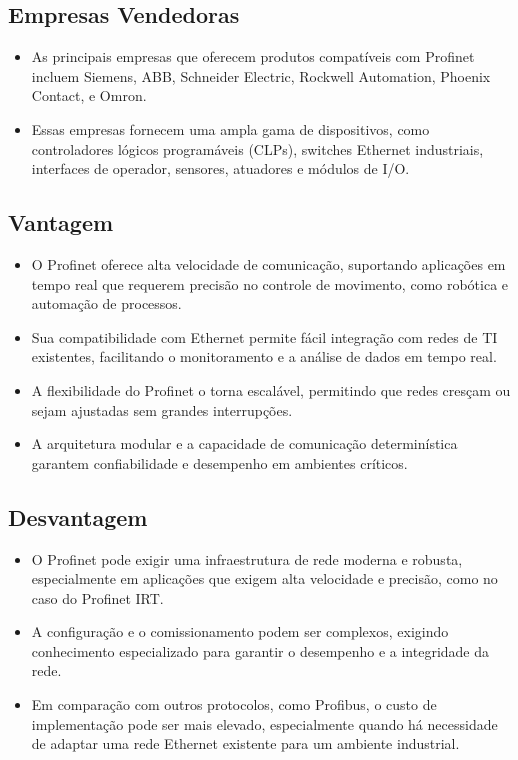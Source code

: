\documentclass[a4paper,11pt]{article} %
\begin{document}
\subsection{Empresas Vendedoras}
\begin{itemize}
    \item As principais empresas que oferecem produtos compatíveis com Profinet incluem Siemens, ABB, Schneider Electric, Rockwell Automation, Phoenix Contact, e Omron.
    \item Essas empresas fornecem uma ampla gama de dispositivos, como controladores lógicos programáveis (CLPs), switches Ethernet industriais, interfaces de operador, sensores, atuadores e módulos de I/O.
\end{itemize}

\subsection{Vantagem}
\begin{itemize}
    \item O Profinet oferece alta velocidade de comunicação, suportando aplicações em tempo real que requerem precisão no controle de movimento, como robótica e automação de processos.
    \item Sua compatibilidade com Ethernet permite fácil integração com redes de TI existentes, facilitando o monitoramento e a análise de dados em tempo real.
    \item A flexibilidade do Profinet o torna escalável, permitindo que redes cresçam ou sejam ajustadas sem grandes interrupções.
    \item A arquitetura modular e a capacidade de comunicação determinística garantem confiabilidade e desempenho em ambientes críticos.
\end{itemize}

\subsection{Desvantagem}
\begin{itemize}
    \item O Profinet pode exigir uma infraestrutura de rede moderna e robusta, especialmente em aplicações que exigem alta velocidade e precisão, como no caso do Profinet IRT.
    \item A configuração e o comissionamento podem ser complexos, exigindo conhecimento especializado para garantir o desempenho e a integridade da rede.
    \item Em comparação com outros protocolos, como Profibus, o custo de implementação pode ser mais elevado, especialmente quando há necessidade de adaptar uma rede Ethernet existente para um ambiente industrial.
\end{itemize}
\end{document}
